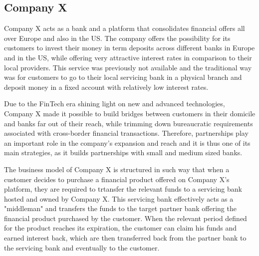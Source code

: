 \documentclass[11pt,a4paper]{article}
\begin{document}
{{\subsection{Company X}
\vspace{-1mm}
 \par Company X acts as a bank and a platform that consolidates financial offers all over Europe and also in the US. The company offers the possibility for its customers to invest their money in term deposits across different banks in Europe and in the US, while offering very attractive interest rates in comparison to their local providers. This service was previously not available and the traditional way was for customers to go to their local servicing bank in a physical branch and deposit money in a fixed account with relatively low interest rates. \par 
Due to the FinTech era shining light on new and advanced technologies, Company X made it possible to build bridges between customers in their domicile and banks far out of their reach, while trimming down bureaucratic requirements associated with cross-border financial transactions. Therefore, partnerships play an important role in the company's expansion and reach and it is thus one of its main strategies, as it builds partnerships with small and medium sized banks.  \par
The business model of Company X is structured in such way that when a customer decides to purchase a financial product offered on Company X's platform, they are required to trtansfer the relevant funds to a servicing bank hosted and owned by Company X. This servicing bank effectively acts as a "middleman" and transfers the funds to the target partner bank offering the financial product purchased by the customer. When the relevant period defined for the product reaches its expiration, the customer can claim his funds and earned interest back, which are then transferred back from the partner bank to the servicing bank and eventually to the customer. \par 
}}
\end{document}
